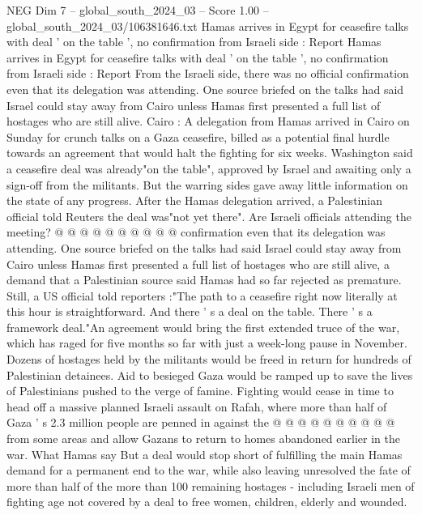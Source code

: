 \begin{textsample}{NEG Dim 7 – global\_south\_2024\_03 – Score 1.00 – global\_south\_2024\_03/106381646.txt}  \label{ex:f7_neg_294}
Hamas arrives in Egypt for ceasefire talks with deal ' on the table ', no confirmation from Israeli side : Report Hamas arrives in Egypt for ceasefire talks with deal ' on the table ', no confirmation from Israeli side : Report From the Israeli side, there was no official confirmation even that its delegation was attending.
One source briefed on the talks had said Israel could stay away from Cairo unless Hamas first presented a full list of hostages who are still alive.
Cairo : A delegation from Hamas arrived in Cairo on Sunday for crunch talks on a Gaza ceasefire, billed as a potential final hurdle towards an agreement that would halt the fighting for six weeks.
Washington said a ceasefire deal was already"on the table", approved by Israel and awaiting only a sign-off from the militants.
But the warring sides gave away little information on the state of any progress.
After the Hamas delegation arrived, a Palestinian official told Reuters the deal was"not yet there".
Are Israeli officials attending the meeting? @ @ @ @ @ @ @ @ @ @ confirmation even that its delegation was attending.
One source briefed on the talks had said Israel could stay away from Cairo unless Hamas first presented a full list of hostages who are still alive, a demand that a Palestinian source said Hamas had so far rejected as premature.
Still, a US official told reporters :"The path to a ceasefire right now literally at this hour is straightforward.
And there ' s a deal on the table.
There ' s a framework deal."An agreement would bring the first extended truce of the war, which has raged for five months so far with just a week-long pause in November.
Dozens of hostages held by the militants would be freed in return for hundreds of Palestinian detainees.
Aid to besieged Gaza would be ramped up to save the lives of Palestinians pushed to the verge of famine.
Fighting would cease in time to head off a massive planned Israeli assault on Rafah, where more than half of Gaza ' s 2.3 million people are penned in against the @ @ @ @ @ @ @ @ @ @ from some areas and allow Gazans to return to homes abandoned earlier in the war.
What Hamas say But a deal would stop short of fulfilling the main Hamas demand for a permanent end to the war, while also leaving unresolved the fate of more than half of the more than 100 remaining hostages - including Israeli men of fighting age not covered by a deal to free women, children, elderly and wounded.

\end{textsample}
